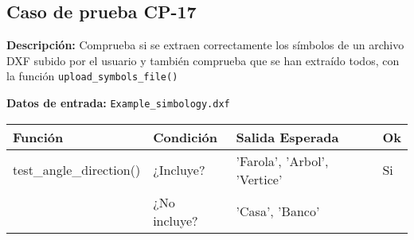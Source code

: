 \subsection{Caso de prueba CP-17}

\textbf{Descripción:} Comprueba si se extraen correctamente los símbolos de un archivo DXF subido por el usuario y también comprueba que se han extraído todos, con la función  \texttt{upload\_symbols\_file()}

\textbf{Datos de entrada:} \texttt{Example\_simbology.dxf}


\begin{longtable}[]{@{}llll@{}}
\toprule
\begin{minipage}[b]{0.6\columnwidth}\raggedright\strut
Función\strut
\end{minipage} & \begin{minipage}[b]{0.20\columnwidth}\raggedright\strut
Condición\strut
\end{minipage} & \begin{minipage}[b]{0.15\columnwidth}\raggedright\strut
Salida Esperada\strut
\end{minipage} & \begin{minipage}[b]{0.05\columnwidth}\raggedright\strut
Ok\strut
\end{minipage}\tabularnewline
\midrule
\endhead
\begin{minipage}[t]{0.6\columnwidth}\raggedright\strut
test\_angle\_direction()\strut
\end{minipage} & \begin{minipage}[t]{0.20\columnwidth}\raggedright\strut
¿Incluye?\strut
\end{minipage} & \begin{minipage}[t]{0.15\columnwidth}\raggedright\strut
'Farola', 'Arbol', 'Vertice'\strut
\end{minipage} & \begin{minipage}[t]{0.05\columnwidth}\raggedright\strut
Si\strut
\end{minipage}\tabularnewline
\begin{minipage}[t]{0.5\columnwidth}\raggedright\strut
\strut
\end{minipage} & \begin{minipage}[t]{0.20\columnwidth}\raggedright\strut
¿No incluye?\strut
\end{minipage} & \begin{minipage}[t]{0.15\columnwidth}\raggedright\strut
'Casa', 'Banco'\strut
\end{minipage} & \begin{minipage}[t]{0.05\columnwidth}\raggedright\strut

\end{minipage}
\end{longtable}

